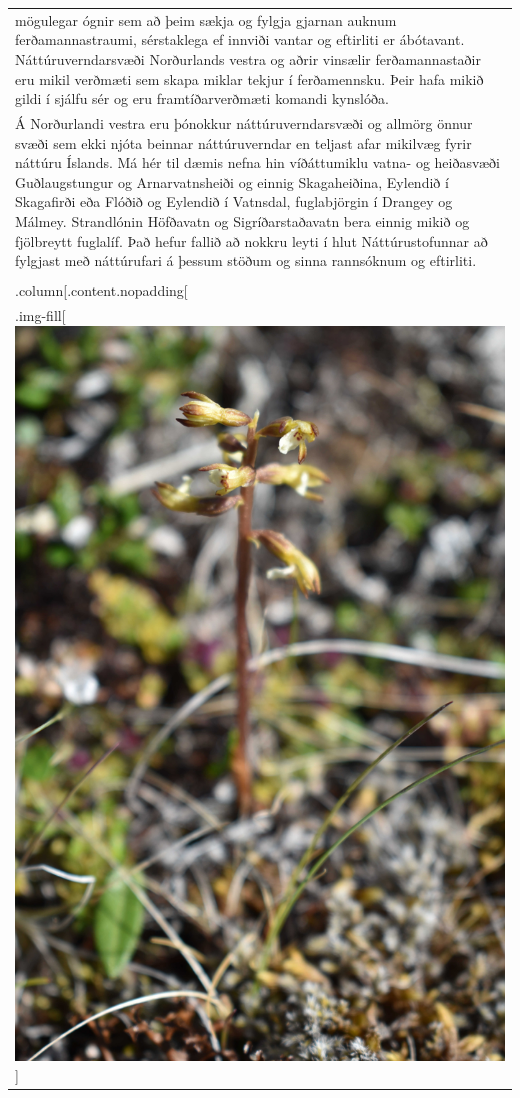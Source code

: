 \documentclass[
]{article}
\begin{document}
\begin{longtable}[]{@{}
  >{\raggedright\arraybackslash}p{}@{}}
mögulegar ógnir sem að þeim sækja og fylgja gjarnan auknum
ferðamannastraumi, sérstaklega ef innviði vantar og eftirliti er
ábótavant. Náttúruverndarsvæði Norðurlands vestra og aðrir vinsælir
ferðamannastaðir eru mikil verðmæti sem skapa miklar tekjur í
ferðamennsku. Þeir hafa mikið gildi í sjálfu sér og eru
framtíðarverðmæti komandi kynslóða. \\
Á Norðurlandi vestra eru þónokkur náttúruverndarsvæði og allmörg önnur
svæði sem ekki njóta beinnar náttúruverndar en teljast afar mikilvæg
fyrir náttúru Íslands. Má hér til dæmis nefna hin víðáttumiklu vatna- og
heiðasvæði Guðlaugstungur og Arnarvatnsheiði og einnig Skagaheiðina,
Eylendið í Skagafirði eða Flóðið og Eylendið í Vatnsdal, fuglabjörgin í
Drangey og Málmey. Strandlónin Höfðavatn og Sigríðarstaðavatn bera
einnig mikið og fjölbreytt fuglalíf. Það hefur fallið að nokkru leyti í
hlut Náttúrustofunnar að fylgjast með náttúrufari á þessum stöðum og
sinna rannsóknum og eftirliti. \\
{]}{]} \\
.column{[}.content.nopadding{[} \\
.img-fill{[}\includegraphics{myndir/blom.JPG}{]} \\

\end{longtable}
\end{document}
